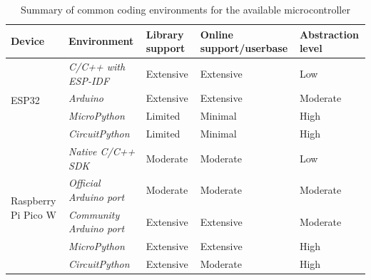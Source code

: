 \begin{table}[ht]
    \centering
    \begin{scriptsize}
    \begin{tabularx}{0.7\textwidth}{|b{}|p{}|X|X|X|}
    \hline
    \textbf{Device}                      & \textbf{Environment}        & \textbf{Library support} & \textbf{Online support/userbase} & \textbf{Abstraction level} \\ \hline
    \multirow{4}{0.08\textwidth}{ESP32}              & \color{black} \textit{C/C++ with ESP-IDF} & \color{ForestGreen} Extensive  & \color{ForestGreen} Extensive & \color{red} Low \\ \cline{2-5} 
                                         & \color{black} \textit{Arduino}            & \color{ForestGreen} Extensive  & \color{ForestGreen} Extensive & \color{ForestGreen} Moderate \\ \cline{2-5} 
                                         & \color{black} \textit{MicroPython}        & \color{red} Limited & \color{red} Minimal & \color{CadetBlue} High \\ \cline{2-5} 
                                         & \color{black} \textit{CircuitPython}      & \color{red} Limited & \color{red} Minimal  & \color{CadetBlue} High \\ \hline
    \multirow{5}{0.08\textwidth}{Raspberry Pi Pico W} & \color{black} \textit{Native C/C++ SDK}   & \color{CadetBlue} Moderate  & \color{CadetBlue} Moderate & \color{red} Low\\ \cline{2-5} 
                                         & \color{black} \textit{Official Arduino port}  & \color{CadetBlue} Moderate & \color{CadetBlue} Moderate & \color{ForestGreen} Moderate \\ \cline{2-5} 
                                         & \color{black} \textit{Community Arduino port}  & \color{ForestGreen} Extensive & \color{ForestGreen} Extensive & \color{ForestGreen} Moderate \\ \cline{2-5} 
                                         & \color{black} \textit{MicroPython}        & \color{ForestGreen} Extensive  & \color{ForestGreen} Extensive & \color{CadetBlue} High \\ \cline{2-5} 
                                         & \color{black} \textit{CircuitPython}      & \color{ForestGreen} Extensive & \color{CadetBlue} Moderate & \color{CadetBlue} High \\ \hline
    \end{tabularx}%
    \end{scriptsize}
    \caption{Summary of common coding environments for the available microcontroller}
    \label{tab:coding-env}
\end{table}

